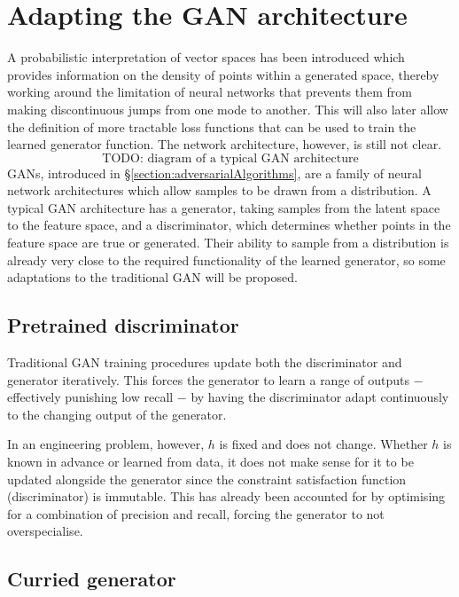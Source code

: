\documentclass[../../main.tex]{subfiles}
\begin{document}
\section{Adapting the GAN architecture} \label{section:adaptingTheGANArchitecture}

A probabilistic interpretation of vector spaces has been introduced which provides information on the density of points within a generated space, thereby working around the limitation of neural networks that prevents them from making discontinuous jumps from one mode to another.
This will also later allow the definition of more tractable loss functions that can be used to train the learned generator function.
The network architecture, however, is still not clear.
\begin{equation}
	\text{TODO: diagram of a typical GAN architecture}
\end{equation}
GANs, introduced in \S\ref{section:adversarialAlgorithms}, are a family of neural network architectures which allow samples to be drawn from a distribution.
A typical GAN architecture has a generator, taking samples from the latent space to the feature space, and a discriminator, which determines whether points in the feature space are true or generated.
Their ability to sample from a distribution is already very close to the required functionality of the learned generator, so some adaptations to the traditional GAN will be proposed.

\subsection{Pretrained discriminator} \label{subsection:pretrainedDiscriminator}

Traditional GAN training procedures update both the discriminator and generator iteratively.
This forces the generator to learn a range of outputs $-$ effectively punishing low recall $-$ by having the discriminator adapt continuously to the changing output of the generator.

In an engineering problem, however, $h$ is fixed and does not change.
Whether $h$ is known in advance or learned from data, it does not make sense for it to be updated alongside the generator since the constraint satisfaction function (discriminator) is immutable.
This has already been accounted for by optimising for a combination of precision and recall, forcing the generator to not overspecialise.

\subsection{Curried generator} \label{subsection:curriedGenerator}
\end{document}
